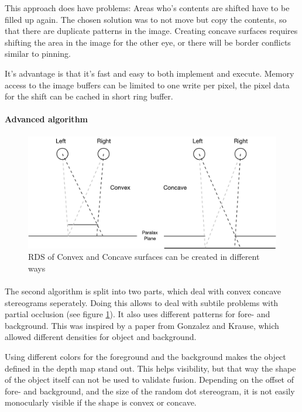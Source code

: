This approach does have problems: Areas who's contents are shifted have to be filled up again. The chosen solution was to not move but copy the contents, so that there are duplicate patterns in the image. Creating concave surfaces requires shifting the area in the image for the other eye, or there will be border conflicts similar to pinning.

It's advantage is that it's fast and easy to both implement and execute. Memory access to the image buffers can be limited to one write per pixel, the pixel data for the shift can be cached in short ring buffer.

\paragraph{Advanced algorithm}
\begin{figure}[htb]
\begin{center}
\includegraphics[width=15.5cm]{media/rds.pdf}
\caption{RDS of Convex and Concave surfaces can be created in different ways\label{ccRDS}}
\end{center}
\end{figure}

\paragraph{}
The second algorithm is split into two parts, which deal with convex concave stereograms seperately. Doing this allows to deal with subtile problems with partial occlusion (see figure \ref{ccRDS}). It also uses different patterns for fore- and background. This was inspired by a paper from Gonzalez and Krause\cite{GenRDS}, which allowed different densities for object and background.

Using different colors for the foreground and the background makes the object defined in the depth map stand out. This helps visibility, but that way the shape of the object itself can not be used to validate fusion. Depending on the offset of fore- and background, and the size of the random dot stereogram, it is not easily monocularly visible if the shape is convex or concave.

